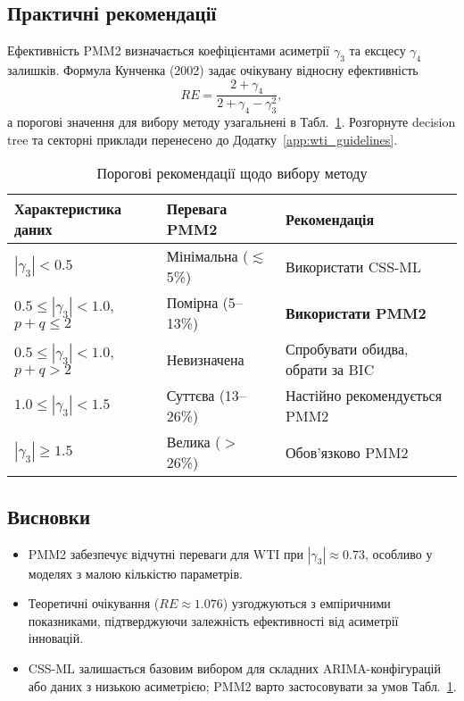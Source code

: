 \documentclass[12pt,a4paper]{article}
\begin{document}
\subsection{Практичні рекомендації}
\label{subsec:wti_practical_recommendations}

Ефективність PMM2 визначається коефіцієнтами асиметрії $\gamma_3$ та ексцесу $\gamma_4$ залишків. Формула Кунченка (2002) задає очікувану відносну ефективність
\begin{equation}
\label{eq:relative_efficiency}
RE = \frac{2 + \gamma_4}{2 + \gamma_4 - \gamma_3^2},
\end{equation}
а порогові значення для вибору методу узагальнені в Табл.~\ref{tab:wti_practical_recommendations}. Розгорнуте decision tree та секторні приклади перенесено до Додатку~\ref{app:wti_guidelines}.

\begin{table}[htbp]
\centering
\caption{Порогові рекомендації щодо вибору методу}
\label{tab:wti_practical_recommendations}
\begin{tabular}{@{}lll@{}}
\toprule
\textbf{Характеристика даних} & \textbf{Перевага PMM2} & \textbf{Рекомендація} \\
\midrule
$|\gamma_3| < 0.5$ & Мінімальна ($\lesssim$5\%) & Використати CSS-ML \\
$0.5 \leq |\gamma_3| < 1.0$, $p+q \leq 2$ & Помірна (5--13\%) & \textbf{Використати PMM2} \\
$0.5 \leq |\gamma_3| < 1.0$, $p+q > 2$ & Невизначена & Спробувати обидва, обрати за BIC \\
$1.0 \leq |\gamma_3| < 1.5$ & Суттєва (13--26\%) & Настійно рекомендується PMM2 \\
$|\gamma_3| \geq 1.5$ & Велика ($>$26\%) & Обов'язково PMM2 \\
\bottomrule
\end{tabular}
\end{table}

\subsection{Висновки}
\label{subsec:wti_empirical_conclusions}

\begin{itemize}
    \item PMM2 забезпечує відчутні переваги для WTI при $|\gamma_3|\approx 0.73$, особливо у моделях з малою кількістю параметрів.
    \item Теоретичні очікування ($RE \approx 1.076$) узгоджуються з емпіричними показниками, підтверджуючи залежність ефективності від асиметрії інновацій.
    \item CSS-ML залишається базовим вибором для складних ARIMA-конфігурацій або даних з низькою асиметрією; PMM2 варто застосовувати за умов Табл.~\ref{tab:wti_practical_recommendations}.
\end{itemize}
\end{document}

